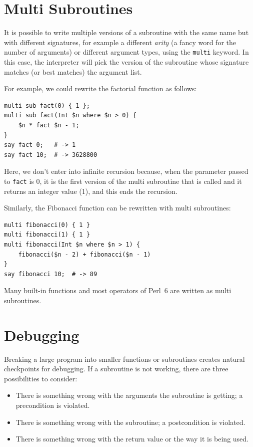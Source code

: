 \section{Multi Subroutines}
\label{multisubs}

It is possible to write multiple versions of a subroutine 
with the same name but with different signatures, for example  
a different \emph{arity} (a fancy word for the number of 
arguments) or different argument types, using the 
{\tt multi} keyword. In this case, the interpreter will 
pick the version of the subroutine whose signature 
matches (or best matches) the argument list.

For example, we could rewrite the factorial function 
as follows:

\begin{verbatim}
multi sub fact(0) { 1 };
multi sub fact(Int $n where $n > 0) {
    $n * fact $n - 1;
}
say fact 0;   # -> 1
say fact 10;  # -> 3628800
\end{verbatim}

Here, we don't enter into infinite recursion because, when 
the parameter passed to {\tt fact} is 0, it is the first 
version of the multi subroutine that is called and it returns 
an integer value (1), and this ends the recursion.

Similarly, the Fibonacci function can be rewritten with 
multi subroutines:

\begin{verbatim}
multi fibonacci(0) { 1 }
multi fibonacci(1) { 1 }
multi fibonacci(Int $n where $n > 1) { 
    fibonacci($n - 2) + fibonacci($n - 1) 
}
say fibonacci 10;  # -> 89
\end{verbatim}

Many built-in functions and most operators of Perl~6 are 
written as multi subroutines.

\section{Debugging}
\label{factdebug}

Breaking a large program into smaller functions or subroutines 
creates natural checkpoints for debugging.  If a subroutine 
is not working, there are three possibilities to consider:

\begin{itemize}

\item There is something wrong with the arguments the subroutine
is getting; a precondition is violated.

\item There is something wrong with the subroutine; a postcondition
is violated.

\item There is something wrong with the return value or the
way it is being used.

\end{itemize}

